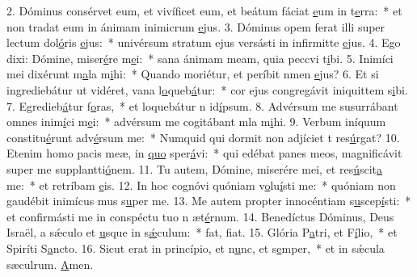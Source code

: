 2. Dóminus consérvet eum, et vivíficet eum, et beátum fáciat \uline{e}um in t\uline{e}rra:~* et non tradat eum in ánimam inimicrum \uline{e}jus.
3. Dóminus opem ferat illi super lectum dol\uline{ó}ris \uline{e}jus:~* univérsum stratum ejus versásti in infirmitte \uline{e}jus.
4. Ego dixi: Dómine, miser\uline{é}re m\uline{e}i:~* sana ánimam meam, quia peccvi t\uline{i}bi.
5. Inimíci mei dixérunt m\uline{a}la m\uline{i}hi:~* Quando moriétur, et períbit nmen \uline{e}jus?
6. Et si ingrediebátur ut vidéret, vana l\uline{o}queb\uline{á}tur:~* cor ejus congregávit iniquittem s\uline{i}bi.
7. Egredieb\uline{á}tur f\uline{o}ras,~* et loquebátur n id\uline{í}psum.
8. Advérsum me susurrábant omnes inim\uline{í}ci m\uline{e}i:~* advérsum me cogitábant mla m\uline{i}hi.
9. Verbum iníquum constitu\uline{é}runt adv\uline{é}rsum me:~* Numquid qui dormit non adjíciet t res\uline{ú}rgat?
10. Etenim homo pacis meæ, in \uline{quo} sper\uline{á}vi:~* qui edébat panes meos, magnificávit super me supplantti\uline{ó}nem.
11. Tu autem, Dómine, miserére mei, et res\uline{ú}scit\uline{a} me:~* et retríbam \uline{e}is.
12. In hoc cognóvi quóniam v\uline{o}lu\uline{í}sti me:~* quóniam non gaudébit inimícus mus s\uline{u}per me.
13. Me autem propter innocéntiam s\uline{u}scep\uline{í}sti:~* et confirmásti me in conspéctu tuo n æt\uline{é}rnum.
14. Benedíctus Dóminus, Deus Israël, a sǽculo et \uline{u}sque in s\uline{ǽ}culum:~* fat, f\uline{i}at.
15. Glória P\uline{a}tri, et F\uline{í}lio,~* et Spiríti S\uline{a}ncto.
16. Sicut erat in princípio, et n\uline{u}nc, et s\uline{e}mper,~* et in sǽcula sæculrum. \uline{A}men.

